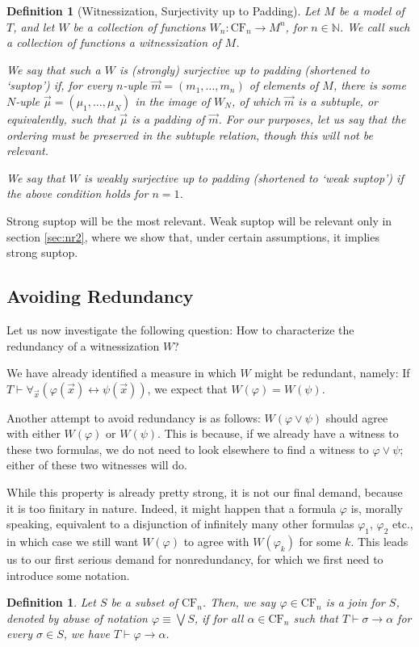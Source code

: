 \documentclass{article}
\newtheorem{definition}[theorem]{Definition}
\theoremstyle{nonumberplain}
\newcommand{\N}{\mathbb{N}}
\newcommand{\CF}{\mathrm{CF}}
\begin{document}
\begin{definition}[Witnessization, Surjectivity up to Padding]
Let $M$ be a model of $T$, and let $W$ be a collection of functions $W_n \colon \CF_n \to M^n$, for $n \in \N$. We call such a collection of functions a \emph{witnessization of $M$}.

We say that such a $W$ is \emph{(strongly) surjective up to padding} (shortened to `suptop') if, for every $n$-uple $\vec m = (m_1, \dots, m_n)$ of elements of $M$, there is some $N$-uple $\vec\mu = (\mu_1, \dots, \mu_N)$ in the image of $W_N$, of which $\vec m$ is a subtuple, or equivalently, such that $\vec\mu$ is a padding of $\vec m$. For our purposes, let us say that the ordering must be preserved in the subtuple relation, though this will not be relevant.

We say that $W$ is \emph{weakly surjective up to padding} (shortened to `weak suptop') if the above condition holds for $n = 1$.
\end{definition}

Strong suptop will be the most relevant. Weak suptop will be relevant only in section \ref{sec:nr2}, where we show that, under certain assumptions, it implies strong suptop.

\subsection{Avoiding Redundancy}

Let us now investigate the following question: How to characterize the redundancy of a witnessization $W$?

We have already identified a measure in which $W$ might be redundant, namely: If $T \vdash \forall_{\vec x}  (\varphi(\vec x) \leftrightarrow \psi(\vec x))$, we expect that $W(\varphi) = W(\psi)$.

Another attempt to avoid redundancy is as follows: $W(\varphi \lor \psi)$ should agree with either $W(\varphi)$ or $W(\psi)$. This is because, if we already have a witness to these two formulas, we do not need to look elsewhere to find a witness to $\varphi \lor \psi$; either of these two witnesses will do.

While this property is already pretty strong, it is not our final demand, because it is too finitary in nature. Indeed, it might happen that a formula $\varphi$ is, morally speaking, equivalent to a disjunction of infinitely many other formulas $\varphi_1$, $\varphi_2$ etc., in which case we still want $W(\varphi)$ to agree with $W(\varphi_k)$ for some $k$. This leads us to our first serious demand for nonredundancy, for which we first need to introduce some notation.
\begin{definition}
Let $S$ be a subset of $\CF_n$. Then, we say $\varphi \in \CF_n$ is a join for $S$, denoted by abuse of notation $\varphi \equiv \bigvee S$, if for all $\alpha \in \CF_n$ such that $T \vdash \sigma \rightarrow \alpha$ for every $\sigma \in S$, we have $T \vdash \varphi \rightarrow \alpha$.
\end{definition}
\end{document}

